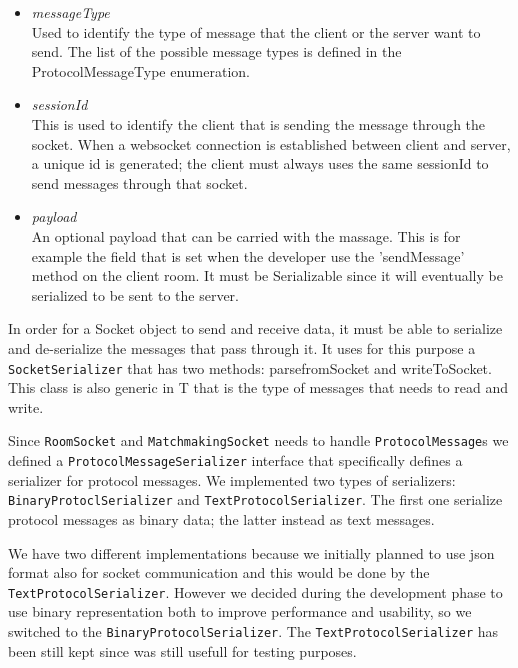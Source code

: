 \begin{itemize}
	\item \textit{messageType} \\
	Used to identify the type of message that the client or the server want to send. The list of the possible message types is defined in the ProtocolMessageType enumeration.
	\item \textit{sessionId} \\
	This is used to identify the client that is sending the message through the socket. When a websocket connection is established between client and server, a unique id is generated; the client must always uses the same sessionId to send messages through that socket.
	\item \textit{payload} \\ 
	An optional payload that can be carried with the massage. This is for example the field that is set when the developer use the 'sendMessage' method on the client room. It must be Serializable since it will eventually be serialized to be sent to the server.
\end{itemize}

In order for a Socket object to send and receive data, it must be able to serialize and de-serialize the messages that pass through it. It uses for this purpose a \texttt{SocketSerializer} that has two methods: parsefromSocket and writeToSocket. This class is also generic in T that is the type of messages that needs to read and write.

Since \texttt{RoomSocket} and \texttt{MatchmakingSocket} needs to handle \texttt{ProtocolMessage}s we defined a \texttt{ProtocolMessageSerializer} interface that specifically defines a serializer for protocol messages. We implemented two types of serializers: \texttt{BinaryProtoclSerializer} and \texttt{TextProtocolSerializer}. The first one serialize protocol messages as binary data; the latter instead as text messages.
 
We have two different implementations because we initially planned to use json format also for socket communication and this would be done by the \texttt{TextProtocolSerializer}. However we decided during the development phase to use binary representation both to improve performance and usability, so we switched to the \texttt{BinaryProtocolSerializer}. The \texttt{TextProtocolSerializer} has been still kept since was still usefull for testing purposes.


